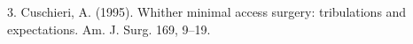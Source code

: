\documentclass[jou, 11pt, longtable, floatsintext, notab]{apa6}
\begin{document}
\begin{hangparas}{.25in}{1}
\cite{shadmehr_error_2010}

\cite{krakauer_human_2011}

3. Cuschieri, A. (1995). Whither minimal access surgery: tribulations and
expectations. Am. J. Surg. 169, 9–19.
\cite{cuschieri_whither_1995}


\cite{den_boer_problems_2001}


\cite{wentink_eye-hand_2001}


\cite{schauer_learning_2003}

\cite{prinz_action_2013}


\end{hangparas}
\end{document}
